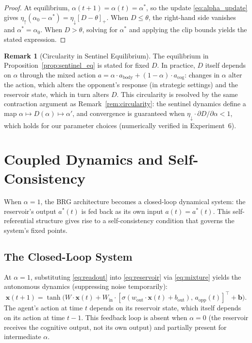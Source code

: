 \documentclass[11pt,a4paper]{article}
\theoremstyle{definition}
\newtheorem{remark}[theorem]{Remark}
\newcommand{\Wres}{W}
\newcommand{\Wout}{w_{\mathrm{out}}}
\newcommand{\Win}{W_{\mathrm{in}}}
\newcommand{\xstate}{\mathbf{x}}
\newcommand{\abody}{a^{*}}
\newcommand{\bout}{b_{\mathrm{out}}}
\begin{document}
\begin{proof}
At equilibrium, $\alpha(t+1) = \alpha(t) = \alpha^{*}$, so the update
\eqref{eq:alpha_update} gives
$\eta_{\uparrow}(\alpha_0 - \alpha^{*}) = \eta_{\downarrow}[D - \theta]_{+}$.
When $D \leq \theta$, the right-hand side vanishes and
$\alpha^{*} = \alpha_0$.  When $D > \theta$, solving for
$\alpha^{*}$ and applying the clip bounds yields the stated expression.
\end{proof}

\begin{remark}[Circularity in Sentinel Equilibrium]
\label{rem:sentinel_circularity}
The equilibrium in Proposition~\ref{prop:sentinel_eq} is stated for fixed $D$.
In practice, $D$ itself depends on $\alpha$ through the mixed action
$a = \alpha \cdot a_{\mathrm{body}} + (1-\alpha) \cdot a_{\mathrm{cog}}$:
changes in $\alpha$ alter the action, which alters the opponent's response
(in strategic settings) and the reservoir state, which in turn alters $D$.
This circularity is resolved by the same contraction argument as
Remark~\ref{rem:circularity}: the sentinel dynamics define a map
$\alpha \mapsto D(\alpha) \mapsto \alpha'$, and convergence is guaranteed
when $\eta_{\downarrow} \cdot \partial D / \partial \alpha < 1$,
which holds for our parameter choices (numerically verified in Experiment~6).
\end{remark}

\section{Coupled Dynamics and Self-Consistency}
\label{sec:coupled_dynamics}

When $\alpha = 1$, the BRG architecture becomes a closed-loop dynamical
system: the reservoir's output $\abody(t)$ is fed back as its own input
$a(t) = \abody(t)$.  This self-referential structure gives rise to a
self-consistency condition that governs the system's fixed points.

\subsection{The Closed-Loop System}

At $\alpha = 1$, substituting \eqref{eq:readout} into \eqref{eq:reservoir}
via \eqref{eq:mixture} yields the autonomous dynamics (suppressing noise
temporarily):
\begin{equation}
\label{eq:closed_loop}
\xstate(t+1) = \tanh\bigl(\Wres \cdot \xstate(t) + \Win \cdot
  [\sigma(\Wout \cdot \xstate(t) + \bout),\, a_{\mathrm{opp}}(t)]^{\top}
  + \mathbf{b}\bigr).
\end{equation}
The agent's action at time $t$ depends on its reservoir state, which itself
depends on its action at time $t-1$.  This feedback loop is absent when
$\alpha = 0$ (the reservoir receives the cognitive output, not its own output)
and partially present for intermediate $\alpha$.
\end{document}
